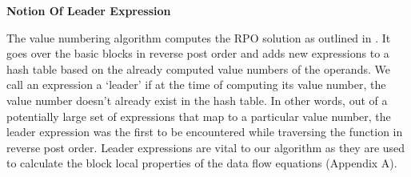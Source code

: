 \documentclass[10pt,twoside]{report}
\begin{document}
\begin{flushleft}
\textbf{\large{Notion Of Leader Expression}}
\end{flushleft}
The value numbering algorithm computes the RPO solution as outlined in
\cite{Cooper95scc-basedvalue}. It goes over the basic blocks in reverse post
order and adds new expressions to a hash table based on the already computed
value numbers of the operands. We call an expression a `leader' if at the time
of computing its value number, the value number doesn't already exist in the
hash table. In other words, out of a potentially large set of expressions that
map to a particular value number, the leader expression was the first to be
encountered while traversing the function in reverse post order. Leader
expressions are vital to our algorithm as they are used to calculate the block
local properties of the data flow equations (Appendix A).
\end{document}
